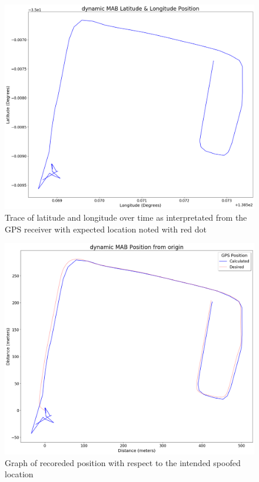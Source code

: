 \begin{figure}[h]
    \begin{centering}
        \includegraphics[width=14cm,keepaspectratio]{Figures/2021_3_30_dynamic_MAB Lat long position.png}
        \caption{Trace of latitude and longitude over time as interpretated from the GPS receiver with expected location noted with red dot}
        \label{fig:MABdynamicCoord}
    \end{centering}
\end{figure}

\begin{figure}[h]
    \begin{centering}
        \includegraphics[width=14cm,keepaspectratio]{Figures/2021_3_30_dynamic_MAB Position from origin.png}
        \caption{Graph of recoreded position with respect to the intended spoofed location}
        \label{fig:MABdynamicPosition}
    \end{centering}
\end{figure}

